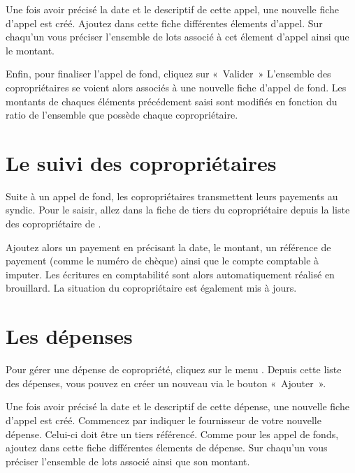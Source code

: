 \documentclass[a4paper,10pt,oneside,french]{sphinxmanual}
\begin{document}
Une fois avoir précisé la date et le descriptif de cette appel, une nouvelle fiche d’appel est créé.
Ajoutez dans cette fiche différentes élements d’appel.
Sur chaqu’un vous préciser l’ensemble de lots associé à cet élement d’appel ainsi que le montant.
\begin{quote}

\noindent{}
\end{quote}

Enfin, pour finaliser l’appel de fond, cliquez sur « Valider »
L’ensemble des copropriétaires se voient alors associés à une nouvelle fiche d’appel de fond.
Les montants de chaques éléments précédement saisi sont modifiés en fonction du ratio de l’ensemble que possède chaque copropriétaire.


\section{Le suivi des copropriétaires}
\label{\detokenize{condominium/payoff:le-suivi-des-coproprietaires}}\label{\detokenize{condominium/payoff::doc}}
Suite à un appel de fond, les copropriétaires transmettent leurs payements au syndic.
Pour le saisir, allez dans la fiche de tiers du copropriétaire depuis la liste des copropriétaire de .
\begin{quote}

\noindent{}
\end{quote}

Ajoutez alors un payement en précisant la date, le montant, un référence de payement (comme le numéro de chèque) ainsi que le compte comptable à imputer.
Les écritures en comptabilité sont alors automatiquement réalisé en brouillard.
La situation du copropriétaire est également mis à jours.


\section{Les dépenses}
\label{\detokenize{condominium/expense:les-depenses}}\label{\detokenize{condominium/expense::doc}}
Pour gérer une dépense de copropriété, cliquez sur le menu .
Depuis cette liste des dépenses, vous pouvez en créer un nouveau via le bouton « Ajouter ».

Une fois avoir précisé la date et le descriptif de cette dépense, une nouvelle fiche d’appel est créé.
Commencez par indiquer le fournisseur de votre nouvelle dépense. Celui-ci doit être un tiers référencé.
Comme pour les appel de fonds, ajoutez dans cette fiche différentes élements de dépense. Sur chaqu’un vous préciser l’ensemble de lots associé ainsi que son montant.
\begin{quote}

\noindent{}
\end{quote}
\end{document}

